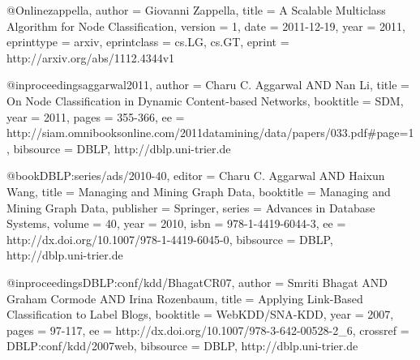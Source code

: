 @Online{zappella,
  author      = {Giovanni Zappella},
  title       = {A Scalable Multiclass Algorithm for Node Classification},
  version     = {1},
  date        = {2011-12-19},
  year        = {2011},
  eprinttype  = {arxiv},
  eprintclass = {cs.LG, cs.GT},
  eprint      = {http://arxiv.org/abs/1112.4344v1}
}

@inproceedings{aggarwal2011,
  author    = {Charu C. Aggarwal AND Nan Li},
  title     = {On Node Classification in Dynamic Content-based Networks},
  booktitle = {SDM},
  year      = {2011},
  pages     = {355-366},
  ee        = {http://siam.omnibooksonline.com/2011datamining/data/papers/033.pdf\#page=1},
  bibsource = {DBLP, http://dblp.uni-trier.de}
}

@book{DBLP:series/ads/2010-40,
  editor    = {Charu C. Aggarwal AND Haixun Wang},
  title     = {Managing and Mining Graph Data},
  booktitle = {Managing and Mining Graph Data},
  publisher = {Springer},
  series    = {Advances in Database Systems},
  volume    = {40},
  year      = {2010},
  isbn      = {978-1-4419-6044-3},
  ee        = {http://dx.doi.org/10.1007/978-1-4419-6045-0},
  bibsource = {DBLP, http://dblp.uni-trier.de}
}

@inproceedings{DBLP:conf/kdd/BhagatCR07,
  author    = {Smriti Bhagat AND Graham Cormode AND Irina Rozenbaum},
  title     = {Applying Link-Based Classification to Label Blogs},
  booktitle = {WebKDD/SNA-KDD},
  year      = {2007},
  pages     = {97-117},
  ee        = {http://dx.doi.org/10.1007/978-3-642-00528-2_6},
  crossref  = {DBLP:conf/kdd/2007web},
  bibsource = {DBLP, http://dblp.uni-trier.de}
}